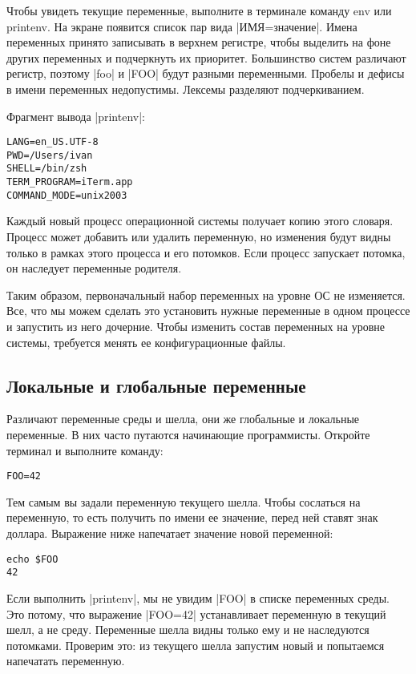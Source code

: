 Чтобы увидеть текущие переменные, выполните в терминале команду env или
printenv. На экране появится список пар вида \spverb|ИМЯ=значение|. Имена переменных
принято записывать в верхнем регистре, чтобы выделить на фоне других переменных
и подчеркнуть их приоритет. Большинство систем различают регистр, поэтому \spverb|foo|
и \spverb|FOO| будут разными переменными. Пробелы и дефисы в имени переменных
недопустимы. Лексемы разделяют подчеркиванием.

Фрагмент вывода \spverb|printenv|:

\begin{verbatim}
LANG=en_US.UTF-8
PWD=/Users/ivan
SHELL=/bin/zsh
TERM_PROGRAM=iTerm.app
COMMAND_MODE=unix2003
\end{verbatim}

Каждый новый процесс операционной системы получает копию этого словаря. Процесс
может добавить или удалить переменную, но изменения будут видны только в рамках
этого процесса и его потомков. Если процесс запускает потомка, он наследует
переменные родителя.

Таким образом, первоначальный набор переменных на уровне ОС не изменяется. Все,
что мы можем сделать это установить нужные переменные в одном процессе и
запустить из него дочерние. Чтобы изменить состав переменных на уровне системы,
требуется менять ее конфигурационные файлы.

\subsection{Локальные и глобальные переменные}

Различают переменные среды и шелла, они же глобальные и локальные переменные. В
них часто путаются начинающие программисты. Откройте терминал и выполните
команду:

\begin{verbatim}
FOO=42
\end{verbatim}

Тем самым вы задали переменную текущего шелла. Чтобы сослаться на переменную, то
есть получить по имени ее значение, перед ней ставят знак доллара. Выражение
ниже напечатает значение новой переменной:

\begin{verbatim}
echo $FOO
42
\end{verbatim}

Если выполнить \spverb|printenv|, мы не увидим \spverb|FOO| в списке переменных среды. Это
потому, что выражение \spverb|FOO=42| устанавливает переменную в текущий шелл, а не
среду. Переменные шелла видны только ему и не наследуются потомками. Проверим
это: из текущего шелла запустим новый и попытаемся напечатать переменную.

